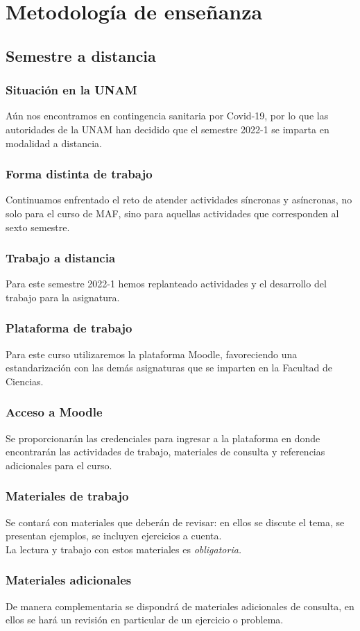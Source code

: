 \section{Metodología de enseñanza}
\subsection{Semestre a distancia}

\begin{frame}
\frametitle{Situación en la UNAM}
Aún nos encontramos en contingencia sanitaria por Covid-19, por lo que las autoridades de la UNAM han decidido que el semestre 2022-1 se imparta en modalidad a distancia.
\end{frame}
\begin{frame}
\frametitle{Forma distinta de trabajo}
Continuamos enfrentado el reto de atender actividades síncronas y asíncronas, no solo para el curso de MAF, sino para aquellas actividades que corresponden al sexto semestre.
\end{frame}
\begin{frame}
\frametitle{Trabajo a distancia}
Para este semestre 2022-1 hemos replanteado actividades y el desarrollo del trabajo para la asignatura.
\end{frame}
\begin{frame}
\frametitle{Plataforma de trabajo}
Para este curso utilizaremos la plataforma Moodle, favoreciendo una estandarización con las demás asignaturas que se imparten en la Facultad de Ciencias.
\end{frame}
\begin{frame}
\frametitle{Acceso a Moodle}
Se proporcionarán las credenciales para ingresar a la plataforma en donde encontrarán las actividades de trabajo, materiales de consulta y referencias adicionales para el curso.
\end{frame}
\begin{frame}
\frametitle{Materiales de trabajo}
Se contará con materiales que deberán de revisar: en ellos se discute el tema, se presentan ejemplos, se incluyen ejercicios a cuenta.
\\
\bigskip
La lectura y trabajo con estos materiales es \emph{obligatoria.}
\end{frame}
\begin{frame}
\frametitle{Materiales adicionales}
De manera complementaria se dispondrá de materiales adicionales de consulta, en ellos se hará un revisión en particular de un ejercicio o problema.
\end{frame}
